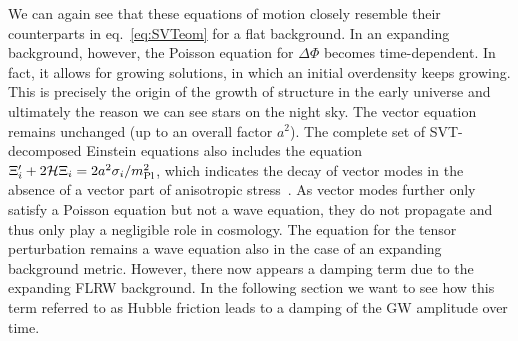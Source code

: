 We can again see that these equations of motion closely resemble their counterparts in eq.~\eqref{eq:SVTeom} for a flat background. In an expanding background, however, the Poisson equation for $\Delta \Phi$ becomes time-dependent. In fact, it allows for growing solutions, in which an initial overdensity keeps growing. This is precisely the origin of the growth of structure in the early  universe and ultimately the reason we can see stars on the night sky. The vector equation remains unchanged (up to an overall factor $a^2$). The complete set of \ac{SVT}-decomposed Einstein equations also includes the equation $\Xi_i^\prime + 2 \mathcal{H} \Xi_i = 2 a^2 \sigma_i/m_\text{Pl}^2$, which indicates the decay of vector modes in the absence of a vector part of anisotropic stress~\cite{Uggla:2011jn}. As vector modes further only satisfy a Poisson equation but not a wave equation, they do not propagate and thus only play a negligible role in cosmology. The equation for the tensor perturbation remains a wave equation also in the case of an expanding background metric. However, there now appears a damping term due to the expanding \ac{FLRW} background. In the following section we want to see how this term referred to as Hubble friction leads to a damping of the \ac{GW} amplitude over time. 



